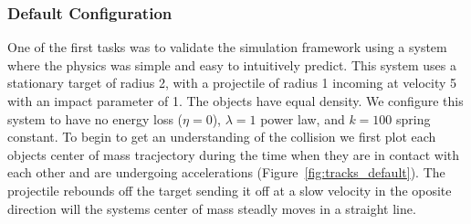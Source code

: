 \documentclass[aps,prl,floatfix,preprint,nofootinbib]{revtex4}
\begin{document}
\subsubsection{Default Configuration}
One of the first tasks was to validate the simulation framework using a system where the physics was simple and easy to intuitively predict. This system uses a stationary target of radius 2, with a projectile of radius 1 incoming at velocity 5 with an impact parameter of 1. The objects have equal density. We configure this system to have no energy loss ($\eta = 0$), $\lambda=1$ power law, and $k=100$ spring constant. To begin to get an understanding of the collision we first plot each objects center of mass tracjectory during the time when they are in contact with each other and are undergoing accelerations (Figure~\ref{fig:tracks_default}). The projectile rebounds off the target sending it off at a slow velocity in the oposite direction will the systems center of mass steadly moves in a straight line.
\end{document}
